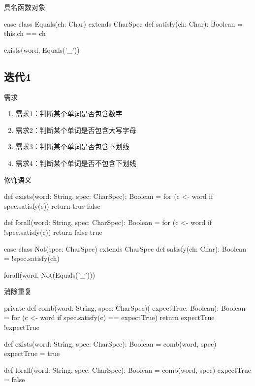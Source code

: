 \begin{frame}[fragile]{具名函数对象}
  \begin{scala}
case class Equals(ch: Char) extends CharSpec {
  def satisfy(ch: Char): Boolean = this.ch == ch
}

exists(word, Equals('_'))
  \end{scala}
\end{frame}

\subsection{迭代4}

\begin{frame}{需求}
  \begin{block}{}
    \begin{enumerate}
    \item \alert{需求1}：判断某个单词是否包含数字
    \item \alert{需求2}：判断某个单词是否包含大写字母
    \item \alert{需求3}：判断某个单词是否包含下划线 
    \item<alert@1-> 需求4：判断某个单词是否不包含下划线     
    \end{enumerate}
  \end{block}
\end{frame}

\begin{frame}[fragile]{修饰语义}
  \begin{scala}
def exists(word: String, spec: CharSpec): Boolean = {
  for (c <- word if spec.satisfy(c))  
    return true
  false
}

def forall(word: String, spec: CharSpec): Boolean = {
  for (c <- word if !spec.satisfy(c))  
    return false
  true
}

case class Not(spec: CharSpec) extends CharSpec {
  def satisfy(ch: Char): Boolean = !spec.satisfy(ch)
}

forall(word, Not(Equals('_')))
  \end{scala}
\end{frame}

\begin{frame}[fragile]{消除重复}
  \begin{scala}
private def comb(word: String, spec: CharSpec)(
  expectTrue: Boolean): Boolean = {
  for (c <- word if spec.satisfy(c) == expectTrue) 
    return expectTrue
  !expectTrue
}

def exists(word: String, spec: CharSpec): Boolean = 
  comb(word, spec) { expectTrue = true }

def forall(word: String, spec: CharSpec): Boolean = 
  comb(word, spec) { expectTrue = false }
  \end{scala}
\end{frame}

